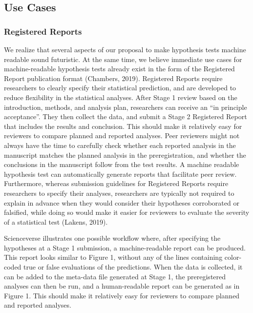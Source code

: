 \documentclass[
  english,
  doc,floatsintext]{apa6}
\begin{document}
\hypertarget{use-cases}{%
\subsection{Use Cases}\label{use-cases}}

\hypertarget{registered-reports}{%
\subsubsection{Registered Reports}\label{registered-reports}}

We realize that several aspects of our proposal to make hypothesis tests machine readable sound futuristic. At the same time, we believe immediate use cases for machine-readable hypothesis tests already exist in the form of the Registered Report publication format (Chambers, 2019). Registered Reports require researchers to clearly specify their statistical prediction, and are developed to reduce flexibility in the statistical analyses. After Stage 1 review based on the introduction, methods, and analysis plan, researchers can receive an \enquote{in principle acceptance}. They then collect the data, and submit a Stage 2 Registered Report that includes the results and conclusion. This should make it relatively easy for reviewers to compare planned and reported analyses. Peer reviewers might not always have the time to carefully check whether each reported analysis in the manuscript matches the planned analysis in the preregistration, and whether the conclusions in the manuscript follow from the test results. A machine readable hypothesis test can automatically generate reports that facilitate peer review. Furthermore, whereas submission guidelines for Registered Reports require researchers to specify their analyses, researchers are typically not required to explain in advance when they would consider their hypotheses corroborated or falsified, while doing so would make it easier for reviewers to evaluate the severity of a statistical test (Lakens, 2019).

Scienceverse illustrates one possible workflow where, after specifying the hypotheses at a Stage 1 submission, a machine-readable report can be produced. This report looks similar to Figure 1, without any of the lines containing color-coded true or false evaluations of the predictions. When the data is collected, it can be added to the meta-data file generated at Stage 1, the preregistered analyses can then be run, and a human-readable report can be generated as in Figure 1. This should make it relatively easy for reviewers to compare planned and reported analyses.
\end{document}

